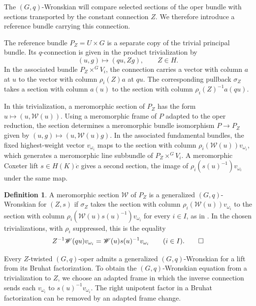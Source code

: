 \documentclass[11pt,leqno]{amsart}
\numberwithin{equation}{section}
\theoremstyle{plain}
\theoremstyle{definition}
\newtheorem{definition}[theorem]{Definition}
\theoremstyle{plain}
\theoremstyle{definition}
\theoremstyle{remark}
\begin{document}
The $(G,q)$-Wronskian will compare selected sections of the oper bundle with sections transported by the constant connection $Z$. We therefore introduce a reference bundle carrying this connection.

The reference bundle $P_Z=U\times G$ is a separate copy of the trivial principal bundle. Its $q$-connection is given in the product trivialization by
\[
 (u,g)\longmapsto(qu,Zg),\qquad Z\in H.
\]
In the associated bundle $P_Z\times^G V_i$, the connection carries a vector with column $a$ at $u$ to the vector with column $\rho_i(Z)a$ at $qu$. The corresponding pullback $\sigma_Z$ takes a section with column $a(u)$ to the section with column $\rho_i(Z)^{-1}a(qu)$.

In this trivialization, a meromorphic section of $P_Z$ has the form $u\mapsto(u,\mathscr W(u))$. Using a meromorphic frame of $P$ adapted to the oper reduction, the section determines a meromorphic bundle isomorphism $P\to P_Z$ given by $(u,g)\mapsto(u,\mathscr W(u)g)$. In the associated fundamental bundles, the fixed highest-weight vector $v_{\omega_i}$ maps to the section with column $\rho_i(\mathscr W(u))v_{\omega_i}$, which generates a meromorphic line subbundle of $P_Z\times^G V_i$. A meromorphic Coxeter lift $s\in H(K)\dot c$ gives a second section, the image of $\rho_i(s(u)^{-1})v_{\omega_i}$ under the same map.

\begin{definition}\label{def:generalized-Gq-Wronskian}
A meromorphic section $\mathscr W$ of $P_Z$ is a generalized $(G,q)$-Wronskian for $(Z,s)$ if $\sigma_Z$ takes the section with column $\rho_i(\mathscr W(u))v_{\omega_i}$ to the section with column $\rho_i(\mathscr W(u)s(u)^{-1})v_{\omega_i}$ for every $i\in I$, as in \cite[Definition~4.9]{KZ2021}. In the chosen trivializations, with $\rho_i$ suppressed, this is the equality
\begin{equation}\label{eq:generalized-Wronskian-definition}
 Z^{-1}\mathscr W(qu)v_{\omega_i}
 =\mathscr W(u)s(u)^{-1}v_{\omega_i}\qquad(i\in I).
\qedhere
\end{equation}
\end{definition}

Every $Z$-twisted $(G,q)$-oper admits a generalized $(G,q)$-Wronskian for a lift from its Bruhat factorization. To obtain the $(G,q)$-Wronskian equation from a trivialization to $Z$, we choose an adapted frame in which the inverse connection sends each $v_{\omega_i}$ to $s(u)^{-1}v_{\omega_i}$. The right unipotent factor in a Bruhat factorization can be removed by an adapted frame change.
\end{document}
